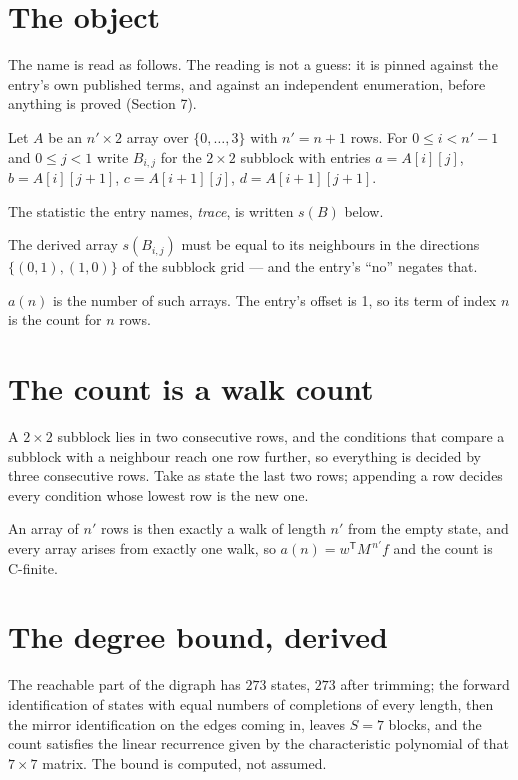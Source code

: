 \documentclass[11pt]{article}
\theoremstyle{definition}
\begin{document}
\section{The object}

The name is read as follows. The reading is not a guess: it is pinned against the entry's own published terms, and against an independent enumeration, before anything is proved (Section 7).

Let $A$ be an $n' \times 2$ array over $\{0,\dots,3\}$ with $n' = n + 1$ rows. For $0 \le i < n'-1$ and $0 \le j < 1$ write $B_{i,j}$ for the $2\times2$ subblock with entries $a = A[i][j]$, $b = A[i][j{+}1]$, $c = A[i{+}1][j]$, $d = A[i{+}1][j{+}1]$.

The statistic the entry names, {\itshape trace}, is written $s(B)$ below.

The derived array $s(B_{i,j})$ must be equal to its neighbours in the directions $\{(0,1), (1,0)\}$ of the subblock grid --- and the entry's ``no'' negates that.

$a(n)$ is the number of such arrays. The entry's offset is 1, so its term of index $n$ is the count for $n$ rows.

\section{The count is a walk count}

A $2\times2$ subblock lies in two consecutive rows, and the conditions that compare a subblock with a neighbour reach one row further, so everything is decided by three consecutive rows. Take as state the last two rows; appending a row decides every condition whose lowest row is the new one.

An array of $n'$ rows is then exactly a walk of length $n'$ from the empty state, and every array arises from exactly one walk, so $a(n) = w^{\mathsf T}M^{\,n'}f$ and the count is C-finite.

\section{The degree bound, derived}

The reachable part of the digraph has $273$ states, $273$ after trimming; the forward identification of states with equal numbers of completions of every length, then the mirror identification on the edges coming in, leaves $S = 7$ blocks, and the count satisfies the linear recurrence given by the characteristic polynomial of that $7\times7$ matrix. The bound is computed, not assumed.
\end{document}

